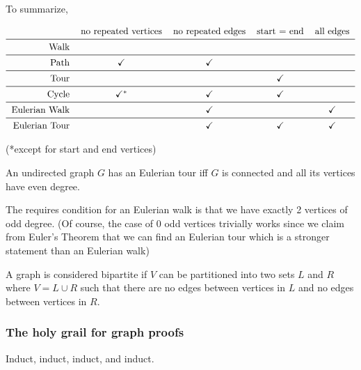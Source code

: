 To summarize,

\[\begin{tabular}{rcccc}
    & no repeated vertices & no repeated edges & start = end & all edges \\\midrule
Walk & & & & \\\midrule
Path & \checkmark & \checkmark & & \\\midrule
Tour & & & \checkmark & \\\midrule
Cycle & \checkmark$^\ast$ & \checkmark & \checkmark & \\\midrule
Eulerian Walk & & \checkmark & & \checkmark \\\midrule
Eulerian Tour & & \checkmark & \checkmark & \checkmark
\end{tabular} \]

(*except for start and end vertices)

\begin{theorem}
    An undirected graph $G$ has an Eulerian tour iff $G$ is connected and all its vertices have even degree. 
\end{theorem}

The requires condition for an Eulerian walk is that we have exactly 2 vertices of odd degree. (Of course, the case of 0 odd vertices trivially works since we claim from Euler's Theorem that we can find an Eulerian tour which is a stronger statement than an Eulerian walk)

\begin{definition}[Bipartite]
    A graph is considered bipartite if $V$ can be partitioned into two sets $L$ and $R$ where $V = L \cup R$ such that there are no edges between vertices in $L$ and no edges between vertices in $R$. 
\end{definition}

\subsubsection{The holy grail for graph proofs}

Induct, induct, induct, and induct.

